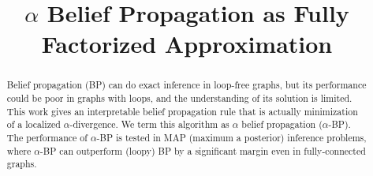 \documentclass[conference]{IEEEtran}
\begin{document}
\title{$\alpha$ Belief Propagation as Fully Factorized Approximation}
\author{

}



\maketitle
\begin{abstract}
  Belief propagation (BP) can do exact inference in loop-free graphs, but its performance could be poor in graphs with loops, and the understanding of its solution is limited.
  This work gives an interpretable belief propagation rule that is actually minimization of a localized $\alpha$-divergence. We term this algorithm as $\alpha$ belief propagation ($\alpha$-BP). %
  The performance of $\alpha$-BP is tested in MAP (maximum a posterior) inference problems, where
  $\alpha$-BP can outperform (loopy) BP by a significant margin even in fully-connected graphs. 
  
\end{abstract}
\end{document}
